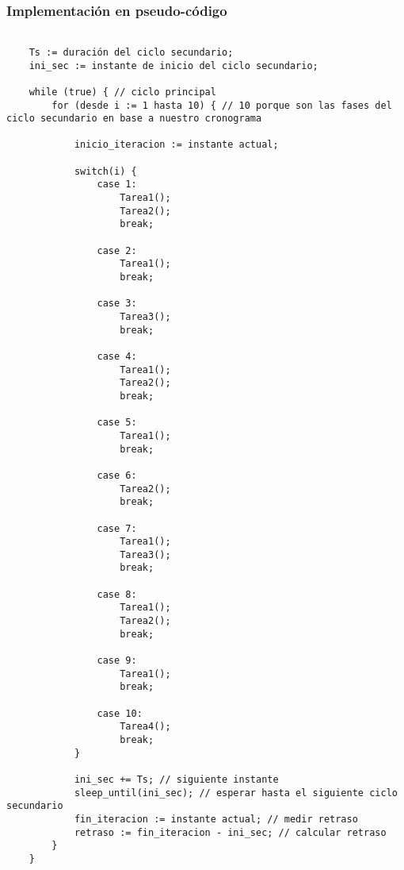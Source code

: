 \documentclass[a4paper,12pt]{article}
\begin{document}
\subsubsection{Implementación en pseudo-código}

\begin{lstlisting}[style=customcpp, caption={Implementación en C++ del planificador cíclico}]

    Ts := duración del ciclo secundario;
    ini_sec := instante de inicio del ciclo secundario;

    while (true) { // ciclo principal
        for (desde i := 1 hasta 10) { // 10 porque son las fases del ciclo secundario en base a nuestro cronograma

            inicio_iteracion := instante actual;

            switch(i) {
                case 1:
                    Tarea1();
                    Tarea2();
                    break;

                case 2:
                    Tarea1();
                    break;

                case 3:
                    Tarea3();
                    break;

                case 4:
                    Tarea1();
                    Tarea2();
                    break;

                case 5:
                    Tarea1();
                    break;

                case 6:
                    Tarea2();
                    break;

                case 7:
                    Tarea1();
                    Tarea3();
                    break;

                case 8:
                    Tarea1();
                    Tarea2();
                    break;

                case 9:
                    Tarea1();
                    break;

                case 10:
                    Tarea4();
                    break;
            }

            ini_sec += Ts; // siguiente instante
            sleep_until(ini_sec); // esperar hasta el siguiente ciclo secundario
            fin_iteracion := instante actual; // medir retraso
            retraso := fin_iteracion - ini_sec; // calcular retraso
        }
    }
\end{lstlisting}
\end{document}
